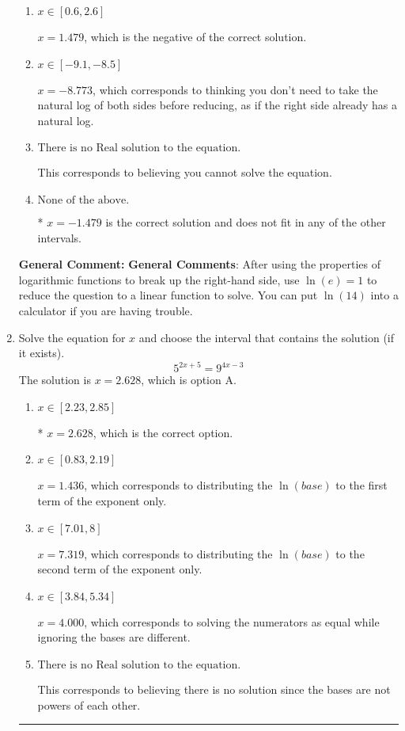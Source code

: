 \documentclass{extbook}[14pt]
\newcommand{\litem}[1]{\item #1

\rule{\textwidth}{0.4pt}}
\begin{document}
\begin{enumerate}
{\begin{enumerate}[label=\Alph*.]
$x = -0.328$, which corresponds to treating any root as a square root.
\item \( x \in [0.6, 2.6] \)

$x = 1.479$, which is the negative of the correct solution.
\item \( x \in [-9.1, -8.5] \)

$x = -8.773$, which corresponds to thinking you don't need to take the natural log of both sides before reducing, as if the right side already has a natural log.
\item \( \text{There is no Real solution to the equation.} \)

This corresponds to believing you cannot solve the equation.
\item \( \text{None of the above.} \)

* $x = -1.479$ is the correct solution and does not fit in any of the other intervals.
\end{enumerate}

\textbf{General Comment:} \textbf{General Comments}: After using the properties of logarithmic functions to break up the right-hand side, use $\ln(e) = 1$ to reduce the question to a linear function to solve. You can put $\ln(14)$ into a calculator if you are having trouble.
}
\litem{
Solve the equation for $x$ and choose the interval that contains the solution (if it exists).
\[ 5^{2x+5} = 9^{4x-3} \]The solution is \( x = 2.628 \), which is option A.\begin{enumerate}[label=\Alph*.]
\item \( x \in [2.23, 2.85] \)

* $x = 2.628$, which is the correct option.
\item \( x \in [0.83, 2.19] \)

$x = 1.436$, which corresponds to distributing the $\ln(base)$ to the first term of the exponent only.
\item \( x \in [7.01, 8] \)

$x = 7.319$, which corresponds to distributing the $\ln(base)$ to the second term of the exponent only.
\item \( x \in [3.84, 5.34] \)

$x = 4.000$, which corresponds to solving the numerators as equal while ignoring the bases are different.
\item \( \text{There is no Real solution to the equation.} \)

This corresponds to believing there is no solution since the bases are not powers of each other.
\end{enumerate}

}
\end{enumerate}
\end{document}
